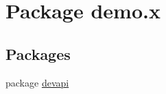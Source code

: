 \hypertarget{namespacedemo_1_1x}{}\section{Package demo.\+x}
\label{namespacedemo_1_1x}
\subsection*{Packages}
\begin{DoxyCompactItemize}
\item 
package \mbox{\hyperlink{namespacedemo_1_1x_1_1devapi}{devapi}}
\end{DoxyCompactItemize}
